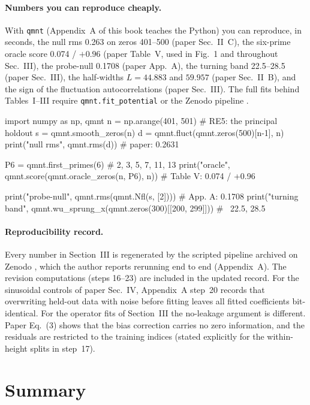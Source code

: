 \paragraph{Numbers you can reproduce cheaply.} With \texttt{qmnt} (Appendix~A of this book teaches the Python) you can reproduce, in seconds, the null rms 0.263 on zeros 401--500 (paper Sec.~II~C), the six-prime oracle score 0.074 / $+0.96$ (paper Table~V, used in Fig.~1 and throughout Sec.~III), the probe-null 0.1708 (paper App.~A), the turning band 22.5--28.5 (paper Sec.~III), the half-widths $L=44.883$ and $59.957$ (paper Sec.~II~B), and the sign of the fluctuation autocorrelations (paper Sec.~III). The full fits behind Tables~I--III require \texttt{qmnt.fit\_potential} or the Zenodo pipeline \cite{zenodo}.

\begin{pycode}
import numpy as np, qmnt
n = np.arange(401, 501)                       # RE5: the principal holdout
s = qmnt.smooth_zeros(n)
d = qmnt.fluct(qmnt.zeros(500)[n-1], n)
print("null rms", qmnt.rms(d))                # paper: 0.2631

P6 = qmnt.first_primes(6)                     # 2, 3, 5, 7, 11, 13
print("oracle", qmnt.score(qmnt.oracle_zeros(n, P6), n))   # Table V: 0.074 / +0.96

print("probe-null", qmnt.rms(qmnt.Nfl(s, [2])))            # App. A: 0.1708
print("turning band", qmnt.wu_sprung_x(qmnt.zeros(300)[[200, 299]]))  # ~22.5, 28.5
\end{pycode}

\paragraph{Reproducibility record.} Every number in Section~III is regenerated by the scripted pipeline archived on Zenodo \cite{zenodo}, which the author reports rerunning end to end (Appendix~A). The revision computations (steps 16--23) are included in the updated record. For the sinusoidal controls of paper Sec.~IV, Appendix~A step~20 records that overwriting held-out data with noise before fitting leaves all fitted coefficients bit-identical. For the operator fits of Section~III the no-leakage argument is different. Paper Eq.~(3) shows that the bias correction carries no zero information, and the residuals are restricted to the training indices (stated explicitly for the within-height splits in step~17).

\section{Summary}\label{sec:paper-memorization-summary}

